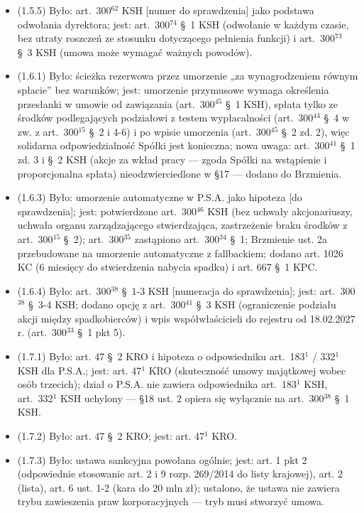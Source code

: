 \documentclass[12pt,a4paper]{report}
\begin{document}
\begin{itemize}
  \item (1.5.5) Było: art.~300$^{62}$ KSH [numer do sprawdzenia] jako podstawa odwołania dyrektora; jest: art.~300$^{74}$ §~1 KSH (odwołanie w każdym czasie, bez utraty roszczeń ze stosunku dotyczącego pełnienia funkcji) i art.~300$^{73}$ §~3 KSH (umowa może wymagać ważnych powodów).
  \item (1.6.1) Było: ścieżka rezerwowa przez umorzenie „za wynagrodzeniem równym spłacie” bez warunków; jest: umorzenie przymusowe wymaga określenia przesłanki w umowie od zawiązania (art.~300$^{45}$ §~1 KSH), spłata tylko ze środków podlegających podziałowi z testem wypłacalności (art.~300$^{44}$ §~4 w zw. z art.~300$^{15}$ §~2 i 4-6) i po wpisie umorzenia (art.~300$^{45}$ §~2 zd. 2), więc solidarna odpowiedzialność Spółki jest konieczna; nowa uwaga: art.~300$^{41}$ §~1 zd. 3 i §~2 KSH (akcje za wkład pracy — zgoda Spółki na wstąpienie i proporcjonalna spłata) nieodzwierciedlone w §17 — dodano do Brzmienia.
  \item (1.6.3) Było: umorzenie automatyczne w P.S.A. jako hipoteza [do sprawdzenia]; jest: potwierdzone art.~300$^{46}$ KSH (bez uchwały akcjonariuszy, uchwała organu zarządzającego stwierdzająca, zastrzeżenie braku środków z art.~300$^{15}$ §~2); art.~300$^{35}$ zastąpiono art.~300$^{34}$ §~1; Brzmienie ust. 2a przebudowane na umorzenie automatyczne z fallbackiem; dodano art. 1026 KC (6 miesięcy do stwierdzenia nabycia spadku) i art. 667 §~1 KPC.
  \item (1.6.4) Było: art.~300$^{38}$ §~1-3 KSH [numeracja do sprawdzenia]; jest: art.~300$^{38}$ §~3-4 KSH; dodano opcję z art.~300$^{41}$ §~3 KSH (ograniczenie podziału akcji między spadkobierców) i wpis współwłaścicieli do rejestru od 18.02.2027 r. (art.~300$^{33}$ §~1 pkt 5).
  \item (1.7.1) Było: art. 47 §~2 KRO i hipoteza o odpowiedniku art.~183$^{1}$ / 332$^{1}$ KSH dla P.S.A.; jest: art. 47$^{1}$ KRO (skuteczność umowy majątkowej wobec osób trzecich); dział o P.S.A. nie zawiera odpowiednika art.~183$^{1}$ KSH, art.~332$^{1}$ KSH uchylony — §18 ust. 2 opiera się wyłącznie na art.~300$^{38}$ §~1 KSH.
  \item (1.7.2) Było: art. 47 §~2 KRO; jest: art. 47$^{1}$ KRO.
  \item (1.7.3) Było: ustawa sankcyjna powołana ogólnie; jest: art. 1 pkt 2 (odpowiednie stosowanie art. 2 i 9 rozp. 269/2014 do listy krajowej), art. 2 (lista), art. 6 ust. 1-2 (kara do 20 mln zł); ustalono, że ustawa nie zawiera trybu zawieszenia praw korporacyjnych — tryb musi stworzyć umowa.

\end{itemize}
\end{document}
